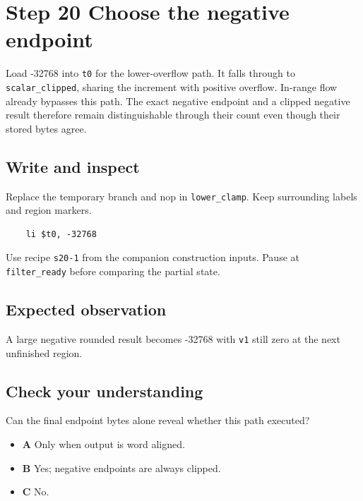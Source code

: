 \section{Step 20 Choose the negative endpoint}\label{fir-s20}

Load -32768 into \texttt{t0} for the lower-overflow path. It falls through to \texttt{scalar\_clipped}, sharing the increment with positive overflow. In-range flow already bypasses this path. The exact negative endpoint and a clipped negative result therefore remain distinguishable through their count even though their stored bytes agree.

\subsection{Write and inspect}
Replace the temporary branch and nop in \texttt{lower\_clamp}. Keep surrounding labels and region markers.

\begin{verbatim}
    li $t0, -32768
\end{verbatim}
Use recipe \texttt{s20-1} from the companion construction inputs. Pause at \texttt{filter\_ready} before comparing the partial state.

\subsection{Expected observation}
A large negative rounded result becomes -32768 with \texttt{v1} still zero at the next unfinished region.

\subsection{Check your understanding}
Can the final endpoint bytes alone reveal whether this path executed?

\begin{itemize}
\item \textbf{A} Only when output is word aligned.
\item \textbf{B} Yes; negative endpoints are always clipped.
\item \textbf{C} No.
\end{itemize}
